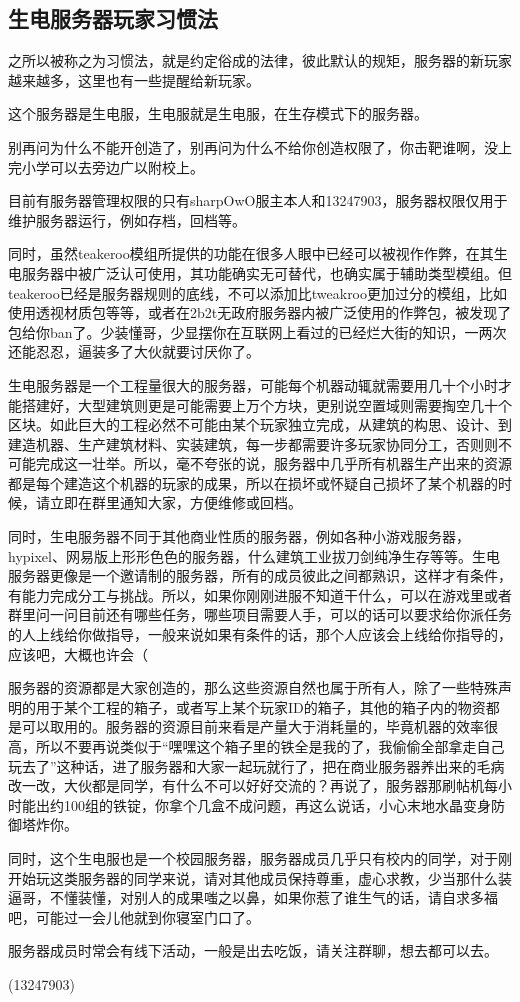 \documentclass[UTF8,a4paper]{article}
\begin{document}
		\subsection{生电服务器玩家习惯法}
			\par 之所以被称之为习惯法，就是约定俗成的法律，彼此默认的规矩，服务器的新玩家越来越多，这里也有一些提醒给新玩家。
			\par 这个服务器是生电服，生电服就是生电服，在生存模式下的服务器。
			\par 别再问为什么不能开创造了，别再问为什么不给你创造权限了，你击靶谁啊，没上完小学可以去旁边广以附校上。
			\par 目前有服务器管理权限的只有sharpOwO服主本人和13247903，服务器权限仅用于维护服务器运行，例如存档，回档等。
			\par 同时，虽然teakeroo模组所提供的功能在很多人眼中已经可以被视作作弊，在其生电服务器中被广泛认可使用，其功能确实无可替代，也确实属于辅助类型模组。但teakeroo已经是服务器规则的底线，不可以添加比tweakroo更加过分的模组，比如使用透视材质包等等，或者在2b2t无政府服务器内被广泛使用的作弊包，被发现了包给你ban了。少装懂哥，少显摆你在互联网上看过的已经烂大街的知识，一两次还能忍忍，逼装多了大伙就要讨厌你了。
			\par 生电服务器是一个工程量很大的服务器，可能每个机器动辄就需要用几十个小时才能搭建好，大型建筑则更是可能需要上万个方块，更别说空置域则需要掏空几十个区块。如此巨大的工程必然不可能由某个玩家独立完成，从建筑的构思、设计、到建造机器、生产建筑材料、实装建筑，每一步都需要许多玩家协同分工，否则则不可能完成这一壮举。所以，毫不夸张的说，服务器中几乎所有机器生产出来的资源都是每个建造这个机器的玩家的成果，所以在损坏或怀疑自己损坏了某个机器的时候，请立即在群里通知大家，方便维修或回档。
			\par 同时，生电服务器不同于其他商业性质的服务器，例如各种小游戏服务器，hypixel、网易版上形形色色的服务器，什么建筑工业拔刀剑纯净生存等等。生电服务器更像是一个邀请制的服务器，所有的成员彼此之间都熟识，这样才有条件，有能力完成分工与挑战。所以，如果你刚刚进服不知道干什么，可以在游戏里或者群里问一问目前还有哪些任务，哪些项目需要人手，可以的话可以要求给你派任务的人上线给你做指导，一般来说如果有条件的话，那个人应该会上线给你指导的，应该吧，大概也许会（
			\par 服务器的资源都是大家创造的，那么这些资源自然也属于所有人，除了一些特殊声明的用于某个工程的箱子，或者写上某个玩家ID的箱子，其他的箱子内的物资都是可以取用的。服务器的资源目前来看是产量大于消耗量的，毕竟机器的效率很高，所以不要再说类似于“嘿嘿这个箱子里的铁全是我的了，我偷偷全部拿走自己玩去了”这种话，进了服务器和大家一起玩就行了，把在商业服务器养出来的毛病改一改，大伙都是同学，有什么不可以好好交流的？再说了，服务器那刷帖机每小时能出约100组的铁锭，你拿个几盒不成问题，再这么说话，小心末地水晶变身防御塔炸你。
			\par 同时，这个生电服也是一个校园服务器，服务器成员几乎只有校内的同学，对于刚开始玩这类服务器的同学来说，请对其他成员保持尊重，虚心求教，少当那什么装逼哥，不懂装懂，对别人的成果嗤之以鼻，如果你惹了谁生气的话，请自求多福吧，可能过一会儿他就到你寝室门口了。
			\par 服务器成员时常会有线下活动，一般是出去吃饭，请关注群聊，想去都可以去。
			\begin{flushright}(13247903)\end{flushright}
	
\end{document}
